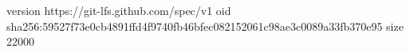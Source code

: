 version https://git-lfs.github.com/spec/v1
oid sha256:59527f73e0cb4891ffd4f9740fb46bfec082152061c98ae3c0089a33fb370e95
size 22000
